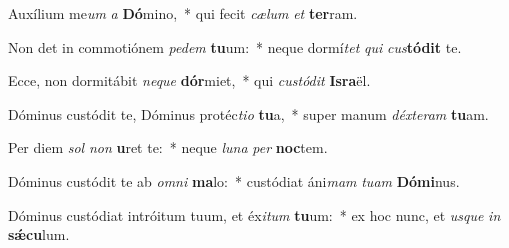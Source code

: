 \item Auxílium me\textit{um} \textit{a} \textbf{Dó}mino,~* qui fecit \textit{cæ}\textit{lum} \textit{et} \textbf{ter}ram.
\item Non det in commotiónem \textit{pe}\textit{dem} \textbf{tu}um:~* neque dormí\textit{tet} \textit{qui} \textit{cus}\textbf{tó}\textbf{dit} te.
\item Ecce, non dormitábit \textit{ne}\textit{que} \textbf{dór}miet,~* qui \textit{cus}\textit{tó}\textit{dit} \textbf{Is}\textbf{ra}ël.
\item Dóminus custódit te, Dóminus protéc\textit{ti}\textit{o} \textbf{tu}a,~* super manum \textit{déx}\textit{te}\textit{ram} \textbf{tu}am.
\item Per diem \textit{sol} \textit{non} \textbf{u}ret te:~* neque \textit{lu}\textit{na} \textit{per} \textbf{noc}tem.
\item Dóminus custódit te ab \textit{om}\textit{ni} \textbf{ma}lo:~* custódiat áni\textit{mam} \textit{tu}\textit{am} \textbf{Dó}\textbf{mi}nus.
\item Dóminus custódiat intróitum tuum, et éx\textit{i}\textit{tum} \textbf{tu}um:~* ex hoc nunc, et \textit{us}\textit{que} \textit{in} \textbf{sǽ}\textbf{cu}lum.
